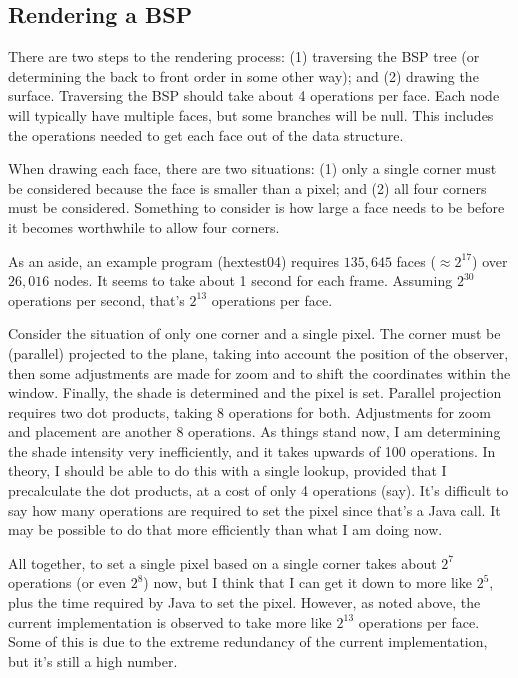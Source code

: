\documentclass[titlepage,oneside,10pt]{article}
\begin{document}
\subsection{Rendering a BSP}

There are two steps to the rendering process: (1) traversing the BSP
tree (or determining the back to front order in some other way); and
(2) drawing the surface. Traversing the BSP should take about 4
operations per face. Each node will typically have multiple faces, but
some branches will be null. This includes the operations needed to get
each face out of the data structure.

When drawing each face, there are two situations: (1) only a single
corner must be considered because the face is smaller than a pixel;
and (2) all four corners must be considered. Something to consider is
how large a face needs to be before it becomes worthwhile to allow
four corners.

As an aside, an example program (hextest04) requires $135,645$ faces
($\approx 2^{17}$) over $26,016$ nodes. It seems to take about 1
second for each frame. Assuming $2^{30}$ operations per second, that's
$2^{13}$ operations per face.

Consider the situation of only one corner and a single pixel. The
corner must be (parallel) projected to the plane, taking into account
the position of the observer, then some adjustments are made for zoom
and to shift the coordinates within the window. Finally, the shade is
determined and the pixel is set. Parallel projection requires two dot
products, taking 8 operations for both. Adjustments for zoom and
placement are another 8 operations. As things stand now, I am
determining the shade intensity very inefficiently, and it takes
upwards of 100 operations. In theory, I should be able to do this with
a single lookup, provided that I precalculate the dot products, at a
cost of only 4 operations (say). It's difficult to say how many
operations are required to set the pixel since that's a Java call. It
may be possible to do that more efficiently than what I am doing now.

All together, to set a single pixel based on a single corner takes
about $2^7$ operations (or even $2^8$) now, but I think that I can get
it down to more like $2^5$, plus the time required by Java to set the
pixel. However, as noted above, the current implementation is observed
to take more like $2^{13}$ operations per face. Some of this is due to
the extreme redundancy of the current implementation, but it's still a
high number.
\end{document}
